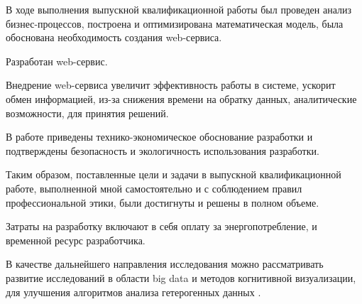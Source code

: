 В ходе выполнения выпускной квалификационной работы был проведен анализ бизнес-процессов, построена и оптимизирована математическая модель, была обоснована необходимость создания web-сервиса.

Разработан web-сервис.

Внедрение web-сервиса увеличит эффективность работы в системе, ускорит обмен информацией, из-за снижения времени на обратку данных, аналитические возможности, для принятия решений.

В работе приведены технико-экономическое обоснование разработки и подтверждены безопасность и экологичность использования разработки.

Таким образом, поставленные цели и задачи в выпускной квалификационной работе, выполненной мной самостоятельно и с соблюдением правил профессиональной этики, были достигнуты и решены в полном объеме.

Затраты на разработку включают в себя оплату за энергопотребление, и временной ресурс разработчика.   

В качестве дальнейшего направления исследования можно рассматривать развитие исследований в области big data и методов когнитивной визуализации, для улучшения алгоритмов анализа гетерогенных данных\cite{1.Зенкин1991} \cite{2.Орлов2004}. 

\pagebreak